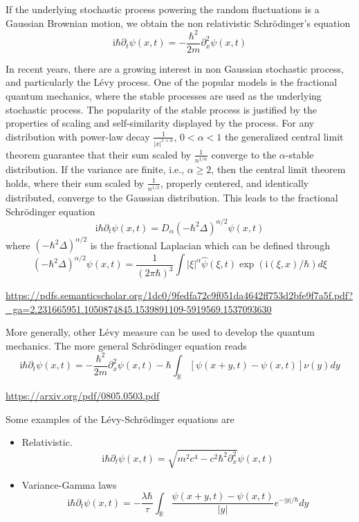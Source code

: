 \documentclass[10pt,a4paper]{article}
\newcommand{\ii}[0]{\mathrm{i}}
\newcommand{\RR}[0]{\mathbb{R}}
\theoremstyle{definition}
\begin{document}
If the underlying stochastic process powering the random fluctuations is a Gaussian Brownian motion, we obtain the non relativistic Schr\"odinger's equation
\begin{equation}
	\ii \hbar \partial_t \psi(x,t) = -\frac{\hbar^2}{2m}\partial^2_{x} \psi(x,t)
\end{equation}

In recent years, there are a growing interest in non Gaussian stochastic process, and particularly the L\'evy process. One of the popular models is the fractional quantum mechanics, where the stable processes are used as the underlying stochastic process. The popularity of the stable process is justified by the properties of scaling and self-similarity displayed by the process. For any distribution with power-law decay $\frac{1}{|x|^{1+\alpha}}$, $0<\alpha<1$ the generalized central limit theorem guarantee that their sum scaled by $\frac{1}{n^{1/\alpha}}$ converge to the $\alpha$-stable distribution. If the variance are finite, i.e., $\alpha\geq 2$, then the central limit theorem holds, where  their sum scaled by $\frac{1}{n^{1/2}}$, properly centered, and identically distributed, converge to the Gaussian distribution.  This leads to the fractional Schr\"odinger equation
\begin{equation}
	\ii \hbar \partial_t \psi(x,t) = D_\alpha (-\hbar^2 \Delta)^{\alpha/2}\psi(x,t)
\end{equation}
where $(-\hbar^2 \Delta)^{\alpha/2}$ is the fractional Laplacian which can be defined through
\begin{equation}
	(-\hbar^2 \Delta)^{\alpha/2}\psi(x,t) = \frac{1}{(2\pi \hbar)^3}\int |\xi|^\alpha \hat \psi(\xi,t) \exp(\ii (\xi,x)/\hbar)d\xi
\end{equation}

\url{https://pdfs.semanticscholar.org/1dc0/9fedfa72c9f051da4642ff753d2bfe9f7a5f.pdf?_ga=2.231665951.1050874845.1539891109-5919569.1537093630}

More generally, other L\'evy measure can be used to develop the quantum mechanics. The more general Schr\"odinger equation reads
\begin{equation}
	\ii \hbar\partial_t \psi(x,t) = -\frac{\hbar^2}{2m}\partial_x^2 \psi(x,t) - \hbar  \int_\RR [\psi(x+y,t)-\psi(x,t)]\nu(y)dy
\end{equation}

\url{https://arxiv.org/pdf/0805.0503.pdf}

Some examples of the L\'evy-Schr\"odinger equations are
\begin{itemize}
	\item Relativistic.
	\begin{equation}
		\ii \hbar\partial_t \psi(x,t) = \sqrt{m^2c^4-c^2\hbar^2\partial_x^2} \psi(x,t)
	\end{equation}
	\item Variance-Gamma laws
	\begin{equation}
		\ii \hbar\partial_t \psi(x,t) = -\frac{\lambda\hbar}{\tau}\int_\RR\frac{\psi(x+y,t)-\psi(x,t)}{|y|}e^{-|y|/\hbar}dy
	\end{equation}

\end{itemize}
\end{document}
